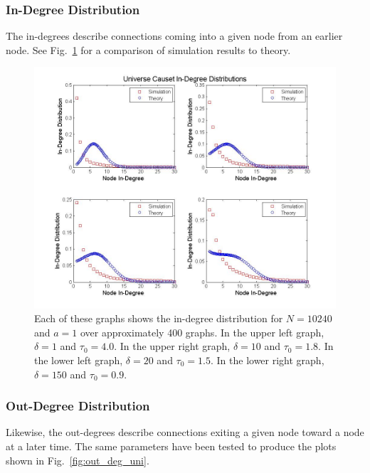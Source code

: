 \documentclass[preprint,notitlepage,amsmath,amssymb,floatfix]{revtex4-1}
\begin{document}
\subsubsection{In-Degree Distribution}
The in-degrees describe connections coming into a given node from an earlier node.
See Fig.~\ref{fig:in_deg_uni} for a comparison of simulation results to theory.

\begin{figure}
\includegraphics[width=18cm]{figures/in_degrees.jpg}
\caption{Each of these graphs shows the in-degree distribution for $N = 10240$ and $a = 1$ over approximately 400 graphs.  In the upper left graph, $\delta = 1$ and $\tau_0 = 4.0$.  In the upper right graph, $\delta = 10$ and $\tau_0 = 1.8$.  In the lower left graph, $\delta = 20$ and $\tau_0 = 1.5$.  In the lower right graph, $\delta = 150$ and $\tau_0 = 0.9$.}
\label{fig:in_deg_uni}
\centering
\end{figure}

\subsubsection{Out-Degree Distribution}
Likewise, the out-degrees describe connections exiting a given node toward a node at a later time.  The same parameters have been tested to produce the plots shown in Fig.~\ref{fig:out_deg_uni}.
\end{document}

